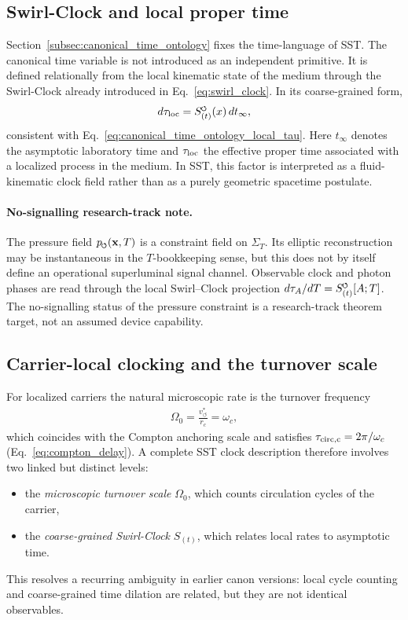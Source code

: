 \documentclass[11pt]{article}
\theoremstyle{definition}
\theoremstyle{plain}
\theoremstyle{remark}
\newcommand{\swirlarrow}{\mathchoice{\mkern-2mu\scriptstyle\boldsymbol{\circlearrowleft}}{\mkern-2mu\scriptstyle\boldsymbol{\circlearrowleft}}{\mkern-2mu\scriptscriptstyle\boldsymbol{\circlearrowleft}}{\mkern-2mu\scriptscriptstyle\boldsymbol{\circlearrowleft}}}
\newcommand{\SwirlClock}{{S_{(t)}^{\swirlarrow}}}
\newcommand{\rc}{{r_c}}
\newcommand{\vchar}{v_{\!\boldsymbol{\circlearrowleft}}^{\ast}}
\begin{document}
    \subsection{Swirl-Clock and local proper time}
        Section~\ref{subsec:canonical_time_ontology} fixes the time-language of SST.
        The canonical time variable is not introduced as an independent primitive. It is defined relationally from the local kinematic state of the medium through the Swirl-Clock already introduced in Eq.~\eqref{eq:swirl_clock}. In its coarse-grained form,
        \begin{align}
            d\tau_{\rm loc} = \SwirlClock(x)\,dt_{\infty},
        \end{align}
        consistent with Eq.~\eqref{eq:canonical_time_ontology_local_tau}.  Here $t_{\infty}$ denotes the asymptotic laboratory time and $\tau_{\rm loc}$ the effective proper time associated with a localized process in the medium. In SST, this factor is interpreted as a fluid-kinematic clock field rather than as a purely geometric spacetime postulate.

        \paragraph{No-signalling research-track note.}
        The pressure field \(p_{\swirlarrow}(\mathbf{x},T)\) is a constraint
        field on \(\Sigma_T\).  Its elliptic reconstruction may be instantaneous
        in the \(T\)-bookkeeping sense, but this does not by itself define an
        operational superluminal signal channel.  Observable clock and photon
        phases are read through the local Swirl--Clock projection
        \(d\tau_A/dT=\SwirlClock[A;T]\).  The no-signalling status of the pressure
        constraint is a research-track theorem target, not an assumed device
        capability.

    \subsection{Carrier-local clocking and the turnover scale}
        For localized carriers the natural microscopic rate is the turnover frequency
        \begin{align}
            \Omega_0 = \frac{\vchar}{\rc} = \omega_c,
        \end{align}
        which coincides with the Compton anchoring scale and satisfies
        \(\tau_{\rm circ,c}=2\pi/\omega_c\) (Eq.~\eqref{eq:compton_delay}).
        A complete SST clock description therefore involves two linked but distinct levels:
        \begin{itemize}
            \item the \emph{microscopic turnover scale} $\Omega_0$, which counts circulation cycles of the carrier,
            \item the \emph{coarse-grained Swirl-Clock} $S_{(t)}$, which relates local rates to asymptotic time.
        \end{itemize}
        This resolves a recurring ambiguity in earlier canon versions: local cycle counting and coarse-grained time dilation are related, but they are not identical observables.
\end{document}
